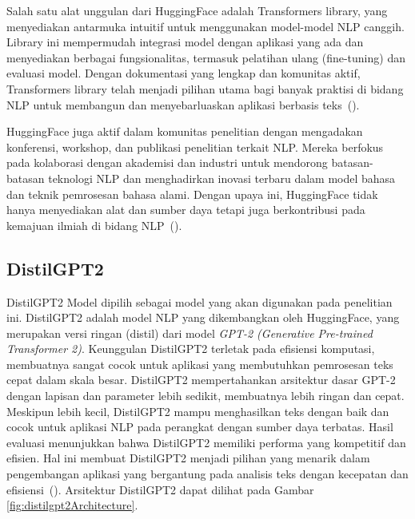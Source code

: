 Salah satu alat unggulan dari HuggingFace adalah Transformers library, yang menyediakan antarmuka intuitif untuk menggunakan model-model NLP canggih. Library ini mempermudah integrasi model dengan aplikasi yang ada dan menyediakan berbagai fungsionalitas, termasuk pelatihan ulang (fine-tuning) dan evaluasi model. Dengan dokumentasi yang lengkap dan komunitas aktif, Transformers library telah menjadi pilihan utama bagi banyak praktisi di bidang NLP untuk membangun dan menyebarluaskan aplikasi berbasis teks~(\cite{wolf2021}).

HuggingFace juga aktif dalam komunitas penelitian dengan mengadakan konferensi, workshop, dan publikasi penelitian terkait NLP. Mereka berfokus pada kolaborasi dengan akademisi dan industri untuk mendorong batasan-batasan teknologi NLP dan menghadirkan inovasi terbaru dalam model bahasa dan teknik pemrosesan bahasa alami. Dengan upaya ini, HuggingFace tidak hanya menyediakan alat dan sumber daya tetapi juga berkontribusi pada kemajuan ilmiah di bidang NLP~(\cite{huggingface}).



\subsection{DistilGPT2}

DistilGPT2 Model dipilih sebagai model yang akan digunakan pada 
penelitian ini. DistilGPT2 adalah model NLP yang dikembangkan oleh 
HuggingFace, yang merupakan versi ringan (distil) dari model 
\emph{GPT-2 (Generative Pre-trained Transformer 2)}. Keunggulan 
DistilGPT2 terletak pada efisiensi komputasi, membuatnya sangat 
cocok untuk aplikasi yang membutuhkan pemrosesan teks cepat dalam 
skala besar. DistilGPT2 mempertahankan arsitektur dasar GPT-2 dengan 
lapisan dan parameter lebih sedikit, membuatnya lebih ringan dan cepat. 
Meskipun lebih kecil, DistilGPT2 mampu menghasilkan teks dengan baik 
dan cocok untuk aplikasi NLP pada perangkat dengan sumber daya 
terbatas. Hasil evaluasi menunjukkan bahwa DistilGPT2 memiliki 
performa yang kompetitif dan efisien. Hal ini membuat DistilGPT2 
menjadi pilihan yang menarik dalam pengembangan aplikasi yang 
bergantung pada analisis teks dengan kecepatan dan efisiensi~(\cite{buzea2022}). 
Arsitektur DistilGPT2 dapat dilihat pada Gambar 
\ref{fig:distilgpt2Architecture}.

